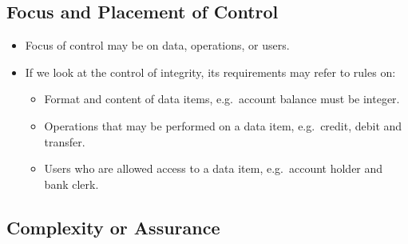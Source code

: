 \documentclass{beamer}
\begin{document}
\subsection{Focus and Placement of Control}

\begin{frame}{\insertsubsectionhead}
  \begin{itemize}
    \item Focus of control may be on data, operations, or users.

    \item If we look at the control of integrity, its requirements may refer to 
      rules on:
      \begin{itemize}
        \item Format and content of data items, e.g.~account balance must be 
          integer.

        \item Operations that may be performed on a data item, e.g.~credit, 
          debit and transfer.

        \item Users who are allowed access to a data item, e.g.~account holder 
          and bank clerk.
      \end{itemize}
  \end{itemize}
\end{frame}



\subsection{Complexity or Assurance}
\end{document}

